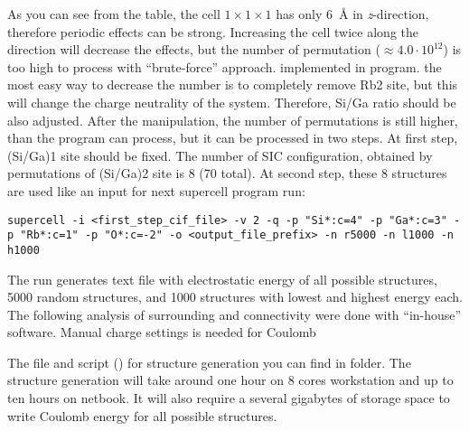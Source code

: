 \documentclass[a4paper,10pt]{article}
\begin{document}
As you can see from the table, the cell $1\times1\times1$ has only 6~\AA{} in \textit{z}-direction, therefore periodic effects can be strong. Increasing the cell twice along the direction will decrease the effects, but the number of permutation ($\approx4.0\cdot10^{12}$) is too high to process with ``brute-force'' approach. implemented in \sups{} program. the most easy way to decrease the number is to completely remove Rb2 site, but this will change the charge neutrality of the system. Therefore, Si/Ga ratio should be also adjusted. After the manipulation, the number of permutations is still higher, than the program can process, but it can be processed in two steps. At first step, (Si/Ga)1 site should be fixed. The number of SIC configuration, obtained by permutations of (Si/Ga)2 site is 8 (70 total). At second step, these 8 structures are used like an input for next supercell program run:
\begin{Verbatim}[breaklines]
  supercell -i <first_step_cif_file> -v 2 -q -p "Si*:c=4" -p "Ga*:c=3" -p "Rb*:c=1" -p "O*:c=-2" -o <output_file_prefix> -n r5000 -n l1000 -n h1000
\end{Verbatim}

The run generates text file with electrostatic energy of all possible structures, \num{5000} random structures, and \num{1000} structures with lowest and highest energy each. The following analysis of surrounding and connectivity were done with ``in-house'' software. Manual charge settings is needed for Coulomb

The  file and script () for structure generation you can find in  folder. The structure generation will take around one hour on 8 cores workstation and up to ten hours on netbook. It will also require a several gigabytes of storage space to write Coulomb energy for all possible structures.
\end{document}
